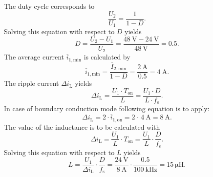 \begin{solutionblock}
	The duty cycle corresponds to
	\begin{equation*}
		\frac{U_\mathrm{2}}{U_\mathrm{1}}=\frac{1}{1-D}.
		\label{eq:voltage_ratio}
	\end{equation*}
	Solving this equation with respect to $D$ yields
	\begin{equation*}
		D=\frac{U_\mathrm{2}-U_\mathrm{1}}{U_\mathrm{2}}=\frac{\SI{48}{\volt}-\SI{24}{\volt}}{\SI{48}{\volt}}=0.5.
		\label{eq:dutycycle}
	\end{equation*}
	The average current $\overline{i}_\mathrm{1,min}$ is calculated by
	\begin{equation*}
		\overline{i}_\mathrm{1,min} = \frac {\overline{I}_\mathrm{2,min}}{1-D}= \frac{\SI{2}{\ampere}}{0.5}=\SI{4}{\ampere}.
	\end{equation*}
	The ripple current $\Delta i_\mathrm{L}$ yields
	\begin{equation*}
		\Delta i_\mathrm{L}=\frac{U_\mathrm{1} \cdot T_\mathrm{on}}{L} =\frac{U_\mathrm{1} \cdot D}{L \cdot f_\mathrm{s}}.
		\label{eq:u_on}
	\end{equation*}
	In case of boundary conduction mode following equation is to apply:
	\begin{equation*}
		\Delta i_\mathrm{L}= 2 \cdot \overline{i}_\mathrm{1,on}= 2 \cdot\ \SI{4}{\ampere} = \SI{8}{\ampere}.
	\end{equation*}
	The value of the inductance is to be calculated with
	\begin{equation*}
		\Delta i_\mathrm{L}= \frac{U_\mathrm{1}}{L} \cdot T_\mathrm{on} = \frac{U_\mathrm{1}}{L} \cdot \frac{D}{f_\mathrm{s}}.
	\end{equation*}
	Solving this equation with respect to $L$ yields
	\begin{equation*}
		L= \frac{U_\mathrm{1}}{\Delta i_\mathrm{L}} \cdot \frac{D}{f_\mathrm{s}} = \frac{\SI{24}{\volt}}{\SI{8}{\ampere}} \cdot \frac{0.5}{\SI{100}{\kilo\hertz}} = \SI{15}{\micro\henry}.
	\end{equation*}
\end{solutionblock}

%


